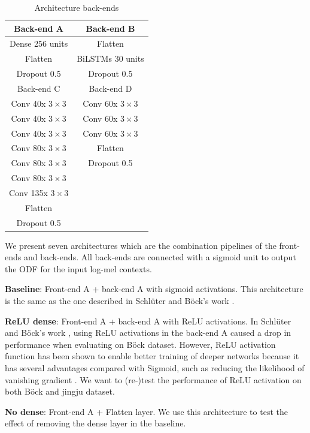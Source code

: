 \begin{table}[ht!]
\centering
\caption{Architecture back-ends}
\label{table:back_ends}
\begin{tabular}{c|c}
\toprule
Back-end A  & Back-end B    \\
\midrule
Dense 256 units & Flatten \\
Flatten & BiLSTMs 30 units \\
Dropout 0.5 & Dropout 0.5\\

\toprule
Back-end C  & Back-end D    \\
\midrule
Conv 40x $3{\times}3$ & Conv 60x $3{\times}3$ \\
Conv 40x $3{\times}3$ & Conv 60x $3{\times}3$ \\
Conv 40x $3{\times}3$ & Conv 60x $3{\times}3$ \\
Conv 80x $3{\times}3$ & Flatten \\
Conv 80x $3{\times}3$ & Dropout 0.5 \\
Conv 80x $3{\times}3$ & \\
Conv 135x $3{\times}3$ & \\
Flatten & \\
Dropout 0.5 & \\
\bottomrule
\end{tabular}
\end{table}

We present seven architectures which are the combination pipelines of the front-ends and back-ends. All back-ends are connected with a sigmoid unit to output the ODF for the input log-mel contexts.

\noindent\textbf{Baseline}: Front-end A + back-end A with sigmoid activations. This architecture is the same as the one described in Schl\"{u}ter and B\"{o}ck's work \cite{Schluter2014}.

\noindent\textbf{ReLU dense}: Front-end A + back-end A with ReLU activations. In Schl\"{u}ter and B\"{o}ck's work \cite{Schluter2014}, using ReLU activations in the back-end A caused a drop in performance when evaluating on B\"{o}ck dataset. However, ReLU activation function has been shown to enable better training of deeper networks because it has several advantages compared with Sigmoid, such as reducing the likelihood of vanishing gradient \cite{Glorot2011}. We want to (re-)test the performance of ReLU activation on both B\"{o}ck and jingju dataset.

\noindent\textbf{No dense}: Front-end A + Flatten layer. We use this architecture to test the effect of removing the dense layer in the baseline.


